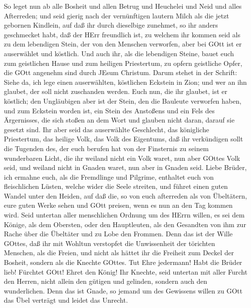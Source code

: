  So leget nun ab alle Bosheit und allen Betrug und Heuchelei
und Neid und alles Afterreden;  und seid gierig nach der
vernünftigen lautern Milch als die jetzt gebornen Kindlein, auf daß ihr
durch dieselbige zunehmet,  so ihr anders geschmecket habt,
daß der HErr freundlich ist,  zu welchem ihr kommen seid als
zu dem lebendigen Stein, der von den Menschen verworfen, aber bei GOtt
ist er auserwählet und köstlich.  Und auch ihr, als die
lebendigen Steine, bauet euch zum geistlichen Hause und zum heiligen
Priestertum, zu opfern geistliche Opfer, die GOtt angenehm sind durch
JEsum Christum.  Darum stehet in der Schrift: Siehe da, ich
lege einen auserwählten, köstlichen Eckstein in Zion; und wer an ihn
glaubet, der soll nicht zuschanden werden.  Euch nun, die
ihr glaubet, ist er köstlich; den Ungläubigen aber ist der Stein, den
die Bauleute verworfen haben, und zum Eckstein worden ist, 
ein Stein des Anstoßens und ein Fels des Ärgernisses, die sich stoßen an
dem Wort und glauben nicht daran, darauf sie gesetzt sind. 
Ihr aber seid das auserwählte Geschlecht, das königliche Priestertum,
das heilige Volk, das Volk des Eigentums, daß ihr verkündigen sollt die
Tugenden des, der euch berufen hat von der Finsternis zu seinem
wunderbaren Licht,  die ihr weiland nicht ein Volk waret,
nun aber GOttes Volk seid, und weiland nicht in Gnaden waret, nun aber
in Gnaden seid.  Liebe Brüder, ich ermahne euch, als die
Fremdlinge und Pilgrime, enthaltet euch von fleischlichen Lüsten, welche
wider die Seele streiten,  und führet einen guten Wandel
unter den Heiden, auf daß die, so von euch afterreden als von
Übeltätern, eure guten Werke sehen und GOtt preisen, wenn es nun an den
Tag kommen wird.  Seid untertan aller menschlichen Ordnung
um des HErrn willen, es sei dem Könige, als dem Obersten, 
oder den Hauptleuten, als den Gesandten von ihm zur Rache über die
Übeltäter und zu Lobe den Frommen.  Denn das ist der Wille
GOttes, daß ihr mit Wohltun verstopfet die Unwissenheit der törichten
Menschen,  als die Freien, und nicht als hättet ihr die
Freiheit zum Deckel der Bosheit, sondern als die Knechte GOttes.
 Tut Ehre jedermann! Habt die Brüder lieb! Fürchtet GOtt!
Ehret den König!  Ihr Knechte, seid untertan mit aller
Furcht den Herren, nicht allein den gütigen und gelinden, sondern auch
den wunderlichen.  Denn das ist Gnade, so jemand um des
Gewissens willen zu GOtt das Übel verträgt und leidet das Unrecht.
